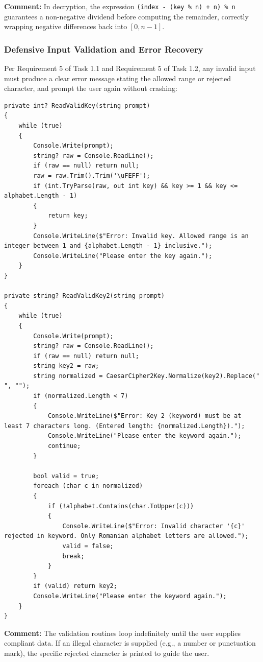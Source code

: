 \documentclass[12pt,a4paper]{article}
\begin{document}
\textbf{Comment:} In decryption, the expression \texttt{(index - (key \% n) + n) \% n} guarantees a non-negative dividend before computing the remainder, correctly wrapping negative differences back into $[0, n-1]$.

\subsubsection{Defensive Input Validation and Error Recovery}
Per Requirement 5 of Task 1.1 and Requirement 5 of Task 1.2, any invalid input must produce a clear error message stating the allowed range or rejected character, and prompt the user again without crashing:

\begin{lstlisting}[caption={Interactive Validation and Prompting in UserMenu.cs}]
private int? ReadValidKey(string prompt)
{
    while (true)
    {
        Console.Write(prompt);
        string? raw = Console.ReadLine();
        if (raw == null) return null;
        raw = raw.Trim().Trim('\uFEFF');
        if (int.TryParse(raw, out int key) && key >= 1 && key <= alphabet.Length - 1)
        {
            return key;
        }
        Console.WriteLine($"Error: Invalid key. Allowed range is an integer between 1 and {alphabet.Length - 1} inclusive.");
        Console.WriteLine("Please enter the key again.");
    }
}

private string? ReadValidKey2(string prompt)
{
    while (true)
    {
        Console.Write(prompt);
        string? raw = Console.ReadLine();
        if (raw == null) return null;
        string key2 = raw;
        string normalized = CaesarCipher2Key.Normalize(key2).Replace(" ", "");
        if (normalized.Length < 7)
        {
            Console.WriteLine($"Error: Key 2 (keyword) must be at least 7 characters long. (Entered length: {normalized.Length}).");
            Console.WriteLine("Please enter the keyword again.");
            continue;
        }

        bool valid = true;
        foreach (char c in normalized)
        {
            if (!alphabet.Contains(char.ToUpper(c)))
            {
                Console.WriteLine($"Error: Invalid character '{c}' rejected in keyword. Only Romanian alphabet letters are allowed.");
                valid = false;
                break;
            }
        }
        if (valid) return key2;
        Console.WriteLine("Please enter the keyword again.");
    }
}
\end{lstlisting}

\textbf{Comment:} The validation routines loop indefinitely until the user supplies compliant data. If an illegal character is supplied (e.g., a number or punctuation mark), the specific rejected character is printed to guide the user.
\end{document}
